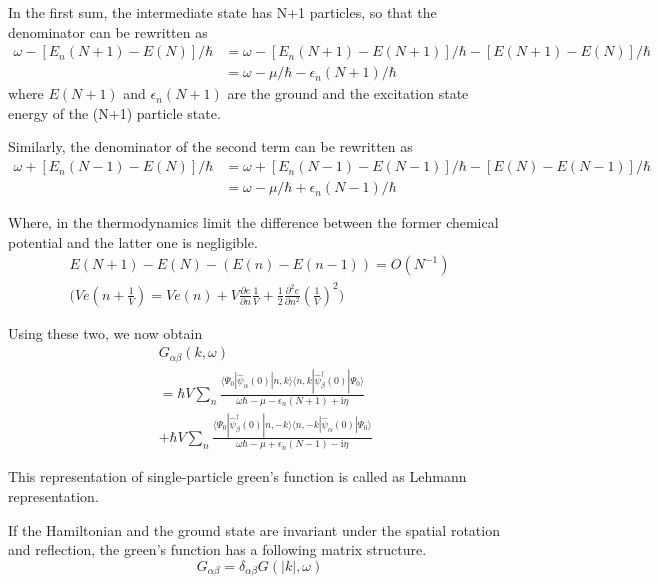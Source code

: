 In the first sum, the intermediate state has N+1 particles, so that the denominator can be rewritten as
\begin{align}
\omega-[E_n(N+1)-E(N)]/\hbar &= \omega-[E_n(N+1)-E(N+1)]/\hbar-[E(N+1)-E(N)]/\hbar \nonumber \\
&=\omega-\mu/\hbar-\epsilon_n(N+1)/\hbar \nonumber
\end{align}
where $E(N+1)$ and $\epsilon_n(N+1)$ are the ground and the excitation state energy of the (N+1) particle state.

Similarly, the denominator of the second term can be rewritten as 
\begin{align}
\omega+[E_n(N-1)-E(N)]/\hbar &= \omega+[E_n(N-1)-E(N-1)]/\hbar-[E(N)-E(N-1)]/\hbar \nonumber \\
&=\omega-\mu/\hbar+\epsilon_n(N-1)/\hbar \nonumber
\end{align}

Where, in the thermodynamics limit the difference between the former chemical potential and the latter one is negligible.
\begin{align}
E(N+1)-E(N)-(E(n)-E(n-1))=O(N^{-1}) \nonumber \\
\bigg ( Ve(n+\frac{1}{V}) = Ve(n)+ V\frac{\partial e}{\partial n}\frac{1}{V} + \frac{1}{2} \frac{\partial^2 e}{\partial n^2} (\frac{1}{V})^2 \bigg) \nonumber
\end{align}

Using these two, we now obtain 
\begin{align}\label{2.3.12}
& G_{\alpha\beta}(k,\omega) \nonumber \\
&=\hbar V\sum_n \frac{\langle\Psi_0|\hat \psi_{\alpha}(0)|n,k\rangle\langle n,k|\hat \psi^{
\dagger}_{\beta} (0)|\Psi_0\rangle}{\omega\hbar-\mu-\epsilon_n(N+1)+\mathrm{i}\eta}  \nonumber \\
&+\hbar V\sum_n \frac{\langle\Psi_0|\hat \psi^{
\dagger}_{\beta} (0)|n,-k\rangle\langle n,-k|\hat \psi_{\alpha}(0)|\Psi_0\rangle}{\omega\hbar-\mu+\epsilon_n(N-1)-\mathrm{i}\eta} 
\end{align}

This representation of single-particle green's function is called as Lehmann representation.

If the Hamiltonian and the ground state are invariant under the spatial rotation and reflection, the green's function has a following matrix structure.
\begin{equation}
G_{\alpha\beta}=\delta_{\alpha\beta}G(|k|,\omega) \nonumber
\end{equation}

